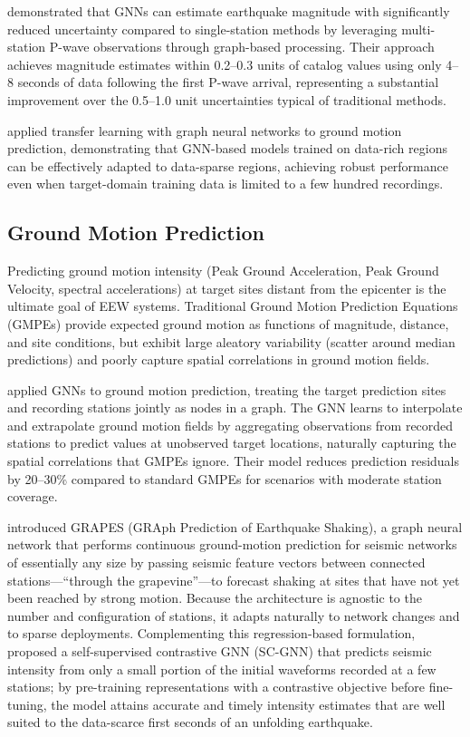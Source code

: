 \documentclass[review,authoryear]{elsarticle}
\begin{document}
\citet{mcbrearty2023earthquake} demonstrated that GNNs can estimate earthquake magnitude with significantly reduced uncertainty compared to single-station methods by leveraging multi-station P-wave observations through graph-based processing. Their approach achieves magnitude estimates within 0.2--0.3 units of catalog values using only 4--8 seconds of data following the first P-wave arrival, representing a substantial improvement over the 0.5--1.0 unit uncertainties typical of traditional methods.

\citet{jozinovic2022transfer} applied transfer learning with graph neural networks to ground motion prediction, demonstrating that GNN-based models trained on data-rich regions can be effectively adapted to data-sparse regions, achieving robust performance even when target-domain training data is limited to a few hundred recordings.

\subsection{Ground Motion Prediction}

Predicting ground motion intensity (Peak Ground Acceleration, Peak Ground Velocity, spectral accelerations) at target sites distant from the epicenter is the ultimate goal of EEW systems. Traditional Ground Motion Prediction Equations (GMPEs) \citep{abrahamson2014nga, boore2014nga} provide expected ground motion as functions of magnitude, distance, and site conditions, but exhibit large aleatory variability (scatter around median predictions) and poorly capture spatial correlations in ground motion fields.

\citet{jozinovic2022ground} applied GNNs to ground motion prediction, treating the target prediction sites and recording stations jointly as nodes in a graph. The GNN learns to interpolate and extrapolate ground motion fields by aggregating observations from recorded stations to predict values at unobserved target locations, naturally capturing the spatial correlations that GMPEs ignore. Their model reduces prediction residuals by 20--30\% compared to standard GMPEs for scenarios with moderate station coverage.

\citet{clements2024grapes} introduced GRAPES (GRAph Prediction of Earthquake Shaking), a graph neural network that performs continuous ground-motion prediction for seismic networks of essentially any size by passing seismic feature vectors between connected stations---``through the grapevine''---to forecast shaking at sites that have not yet been reached by strong motion. Because the architecture is agnostic to the number and configuration of stations, it adapts naturally to network changes and to sparse deployments. Complementing this regression-based formulation, \citet{murshed2024scgnn} proposed a self-supervised contrastive GNN (SC-GNN) that predicts seismic intensity from only a small portion of the initial waveforms recorded at a few stations; by pre-training representations with a contrastive objective before fine-tuning, the model attains accurate and timely intensity estimates that are well suited to the data-scarce first seconds of an unfolding earthquake.
\end{document}
